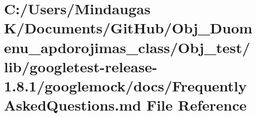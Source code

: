 \hypertarget{_obj__test_2lib_2googletest-release-1_88_81_2googlemock_2docs_2_frequently_asked_questions_8md}{}\section{C\+:/\+Users/\+Mindaugas K/\+Documents/\+Git\+Hub/\+Obj\+\_\+\+Duomenu\+\_\+apdorojimas\+\_\+class/\+Obj\+\_\+test/lib/googletest-\/release-\/1.8.1/googlemock/docs/\+Frequently\+Asked\+Questions.md File Reference}
\label{_obj__test_2lib_2googletest-release-1_88_81_2googlemock_2docs_2_frequently_asked_questions_8md}
